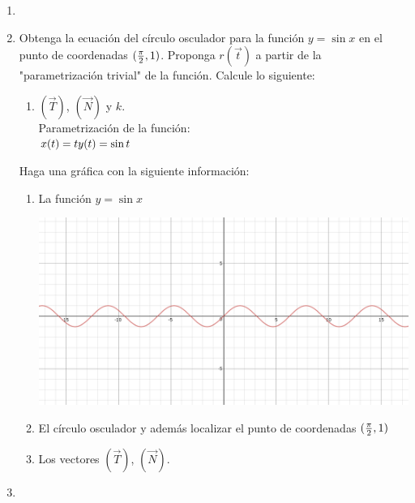 \documentclass[10pt,letterpaper,fleqn]{article}
\begin{document}
\begin{enumerate}
        \item

        \item Obtenga la ecuación del círculo osculador para la función $y=\sin x$ en el punto de coordenadas $({\pi \over 2},1)$. Proponga $r(\overrightarrow{t})$ a partir de la "parametrización trivial" de la función. Calcule lo siguiente: 
        \begin{enumerate}
            \item $(\overrightarrow{T})$, $(\overrightarrow{N})$ y $k$.\\
            Parametrización de la función: \\
            $x(t) = t \\
             y(t) = \sin t$
        \end{enumerate}
        Haga una gráfica con la siguiente información:
        \begin{enumerate}
            \item La función $y=\sin x$ \\
            \begin{center}
                \includegraphics[scale=.3]{assets/img/ejercicio8(b).png}
            \end{center}
            \item El círculo osculador y además localizar el punto de coordenadas $({\pi \over 2},1)$
            \item Los vectores $(\overrightarrow{T})$, $(\overrightarrow{N})$.
        \end{enumerate}

        \item 


    \end{enumerate}
\end{document}
